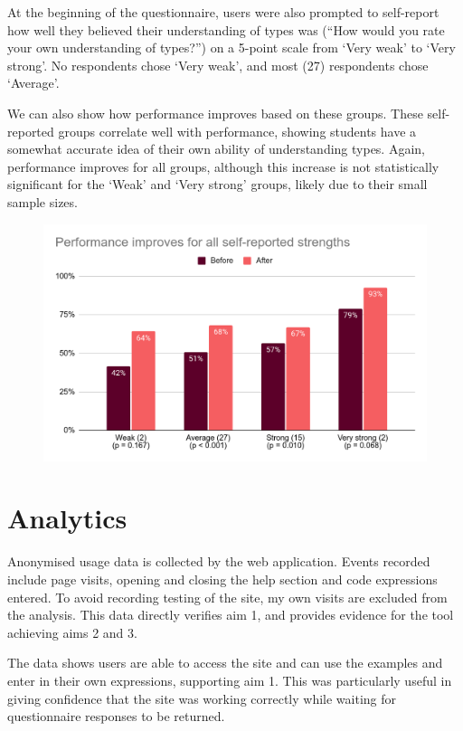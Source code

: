 \documentclass[a4paper,fleqn,oneside,12pt]{report}
\begin{document}
At the beginning of the questionnaire, users were also prompted to self-report how well they believed their understanding of types was (``How would you rate your own understanding of types?'') on a 5-point scale from `Very weak' to `Very strong'. No respondents chose ‘Very weak’, and most (27) respondents chose `Average'.

We can also show how performance improves based on these groups. These self-reported groups correlate well with performance, showing students have a somewhat accurate idea of their own ability of understanding types. Again, performance improves for all groups, although this increase is not statistically significant for the `Weak' and `Very strong' groups, likely due to their small sample sizes.

{\centering \begin{figure}[h!]
  \centering
  \includegraphics[width=0.85\linewidth]{images/image27.png}
  \label{figure:evaluation_testperformanceselfreported}
\end{figure} \par}

\section{Analytics}\label{id:h.67g05flyfv0z}

Anonymised usage data is collected by the web application. Events recorded include page visits, opening and closing the help section and code expressions entered. To avoid recording testing of the site, my own visits are excluded from the analysis. This data directly verifies aim 1, and provides evidence for the tool achieving aims 2 and 3.

The data shows users are able to access the site and can use the examples and enter in their own expressions, supporting aim 1. This was particularly useful in giving confidence that the site was working correctly while waiting for questionnaire responses to be returned.
\end{document}

